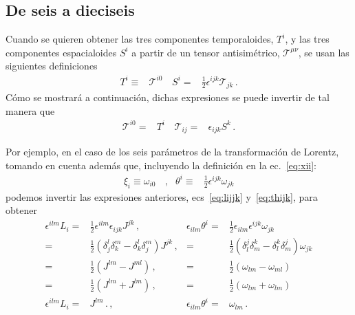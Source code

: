 \subsection{De seis a dieciseis}
\begin{frame}
Cuando se quieren obtener las tres componentes temporaloides, $T^i$, y las tres componentes espacialoides $S^i$
a partir de un tensor antisimétrico, $\mathcal{T}^{\mu\nu}$, se usan las siguientes definiciones
\begin{align}
  T^i\equiv &\mathcal{T}^{i0}\,& S^i=& \frac{1}{2}\epsilon^{ijk}\mathcal{T}_{jk}\,.
\end{align}
Cómo se mostrará a continuación, dichas expresiones se puede invertir de tal manera que
\begin{align}
  \mathcal{T}^{i0}= &T^i\,& \mathcal{T}_{ij} =&\epsilon_{ijk}S^k\,.
\end{align}
\end{frame}

Por ejemplo, en el caso de los seis parámetros de la transformación de Lorentz, tomando en cuenta además que, incluyendo la definición  en la ec.~\eqref{eq:xii}:
\begin{align}
\label{eq:thijk}
\xi_i\equiv \omega_{i0}&\,,&\theta^i\equiv&\frac{1}{2}\epsilon^{ijk}\omega_{jk}
\end{align}
podemos invertir las expresiones anteriores, ecs~\eqref{eq:lijjk} y~\eqref{eq:thijk}, para obtener
\begin{align}
\epsilon^{ilm}L_i=&\frac{1}{2}\epsilon^{ilm}\epsilon_{ijk}J^{jk}               \,,&\epsilon_{ilm}\theta^i=&\frac{1}{2}\epsilon_{ilm}\epsilon^{ijk}\omega_{jk}         \nonumber\\
  =&\frac{1}{2}\left( \delta_j^l\delta_k^m-\delta_k^l\delta_j^m \right)J^{jk} \,,& =&\frac{1}{2}\left( \delta_l^j\delta_m^k-\delta_l^k\delta_m^j \right)\omega_{jk} \nonumber\\
  =&\frac{1}{2}\left(J^{lm}-J^{ml} \right)                                   \,,& =&\frac{1}{2}\left(\omega_{lm}-\omega_{ml} \right)                         \nonumber\\
  =&\frac{1}{2}\left(J^{lm}+J^{lm} \right)                                   \,,& =&\frac{1}{2}\left(\omega_{lm}+\omega_{lm} \right)                     \nonumber\\
\epsilon^{ilm}L_i=&J^{lm}\,.                                                                \,,&\epsilon_{ilm}\theta^i=&\omega_{lm}\,.
\end{align}

